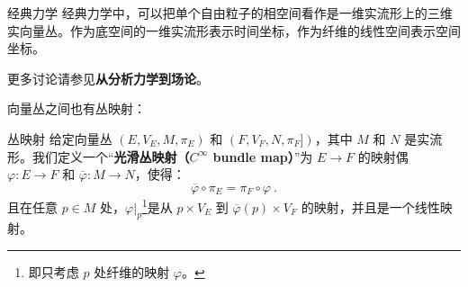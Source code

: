 \begin{example}{经典力学}
经典力学中，可以把单个自由粒子的相空间看作是一维实流形上的三维实向量丛。作为底空间的一维实流形表示时间坐标，作为纤维的线性空间表示空间坐标。

更多讨论请参见\textbf{从分析力学到场论}。
\end{example}





向量丛之间也有丛映射：

\begin{definition}{丛映射}
给定向量丛 $(E, V_E, M, \pi_E)$ 和 $(F, V_F, N, \pi_F])$，其中 $M$ 和 $N$ 是实流形。我们定义一个“\textbf{光滑丛映射（$C^\infty$ bundle map）}”为 $E\rightarrow F$ 的映射偶 $\varphi: E\rightarrow F$ 和 $\overline{\varphi}: M\rightarrow N$，使得：
\begin{equation}
\overline{\varphi}\circ\pi_E=\pi_F\circ\varphi~.
\end{equation}
且在任意 $p\in M$ 处，$\varphi|_p$\footnote{即只考虑 $p$ 处纤维的映射 $\varphi$。}是从 $p\times V_E$ 到 $\overline{\varphi}(p)\times V_F$ 的映射，并且是一个线性映射。
\end{definition}





